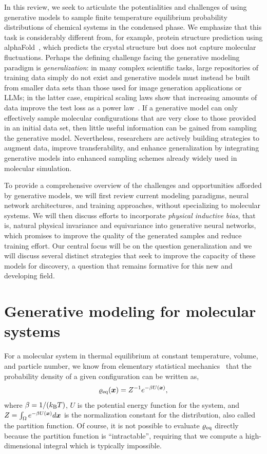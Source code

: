 \documentclass[11pt]{article}
\begin{document}
In this review, we seek to articulate the potentialities and challenges of using generative models to sample finite temperature equilibrium probability distributions of chemical systems in the condensed phase.
We emphasize that this task is considerably different from, for example, protein structure prediction using alphaFold~\cite{jumper_highly_2021}, which predicts the crystal structure but does not capture molecular fluctuations.
Perhaps the defining challenge facing the generative modeling paradigm is \emph{generalization}: in many complex scientific tasks, large repositories of training data simply do not exist and generative models must instead be built from smaller data sets than those used for image generation applications or LLMs; in the latter case, empirical scaling laws show that increasing amounts of data improve the test loss as a power law~\cite{kaplan_scaling_2020, dyer_explaining_2021}.
If a generative model can only effectively sample molecular configurations that are very close to those provided in an initial data set, then little useful information can be gained from sampling the generative model. 
Nevertheless, researchers are actively building strategies to augment data, improve transferability, and enhance generalization by integrating generative models into enhanced sampling schemes already widely used in molecular simulation.

To provide a comprehensive overview of the challenges and opportunities afforded by generative models, we will first review current modeling paradigms, neural network architectures, and training approaches, without specializing to molecular systems. 
We will then discuss efforts to incorporate \emph{physical inductive bias}, that is, natural physical invariance and equivariance into generative neural networks, which promises to improve the quality of the generated samples and reduce training effort.
Our central focus will be on the question generalization and we will discuss several distinct strategies that seek to improve the capacity of these models for discovery, a question that remains formative for this new and developing field.


\section{Generative modeling for molecular systems}

For a molecular system in thermal equilibrium at constant temperature, volume, and particle number, we know from elementary statistical mechanics~\cite{chandler_introduction_1987} that the probability density of a given configuration can be written as,
\begin{equation}
    \varrho_{\rm eq}(\boldsymbol{x}) = Z^{-1} e^{-\beta U(\boldsymbol{x})},
    \label{eq:rhoeq}
\end{equation}
where $\beta=1/(k_{\rm B} T)$, $U$ is the potential energy function for the system, and $Z = \int_{\Omega} e^{-\beta U(\boldsymbol{x})} d\boldsymbol{x}$ is the normalization constant for the distribution, also called the partition function. 
Of course, it is not possible to evaluate $\varrho_{\rm eq}$ directly because the partition function is ``intractable'', requiring that we compute a high-dimensional integral which is typically impossible.
\end{document}
